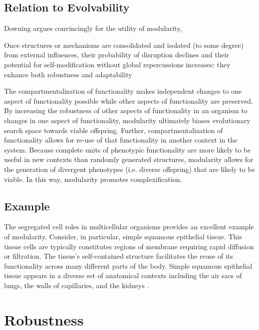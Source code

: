 \subsection{Relation to Evolvability}
Downing argues convincingly for the utility of modularity,
\begin{displayquote}
Once structures or mechanisms are consolidated and isolated (to some degree) from external influences, their probability of disruption declines and their potential for self-modification without global repercussions increases: they enhance both robustness and adaptability \cite[p 208]{Downing2015IntelligenceSystems}
\end{displayquote}
The compartmentalization of functionality makes independent changes to one aspect of functionality possible while other aspects of functionality are preserved.
By increasing the robustness of other aspects of functionality in an organism to changes in one aspect of functionality, modularity ultimately biases evolutionary search space towards viable offspring.
Further, compartmentalization of functionality allows for re-use of that functionality in another context in the system.
Because complete units of phenotypic functionality are more likely to be useful in new contexts than randomly generated structures, modularity allows for the generation of divergent phenotypes (i.e. diverse offspring) that are likely to be viable. In this way, modularity promotes complexification.

\subsection{Example}
The segregated cell roles in multicellular organisms provides an excellent example of modularity.
Consider, in particular, simple squamous epithelial tissue.
This tissue cells are typically constitutes regions of membrane requiring rapid diffusion or filtration.
The tissue's self-contained structure facilitates the reuse of its functionality across many different parts of the body.
Simple squamous epithelial tissue appears in a diverse set of anatomical contexts including the air sacs of lungs, the walls of capillaries, and the kidneys \cite{Owens2003TheKeratins}.

\section{Robustness} \label{sec:robustness}
